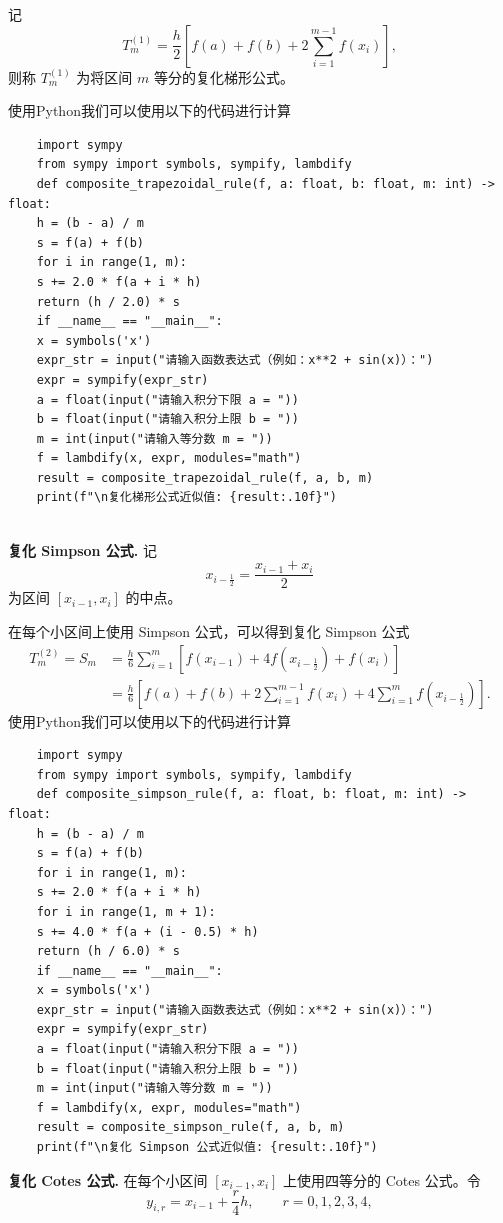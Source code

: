 记
\[
T_m^{(1)}
=\frac{h}{2}\left[f(a)+f(b)+2\sum_{i=1}^{m-1}f(x_i)\right],
\]
则称 $T_m^{(1)}$ 为将区间 $m$ 等分的复化梯形公式。

使用Python我们可以使用以下的代码进行计算
\begin{verbatim}
	import sympy
	from sympy import symbols, sympify, lambdify
	def composite_trapezoidal_rule(f, a: float, b: float, m: int) -> float:
	h = (b - a) / m
	s = f(a) + f(b)
	for i in range(1, m):
	s += 2.0 * f(a + i * h)
	return (h / 2.0) * s
	if __name__ == "__main__":
	x = symbols('x')
	expr_str = input("请输入函数表达式（例如：x**2 + sin(x)）：")
	expr = sympify(expr_str)
	a = float(input("请输入积分下限 a = "))
	b = float(input("请输入积分上限 b = "))
	m = int(input("请输入等分数 m = "))
	f = lambdify(x, expr, modules="math")
	result = composite_trapezoidal_rule(f, a, b, m)
	print(f"\n复化梯形公式近似值: {result:.10f}")
	
\end{verbatim}
	\textbf{复化 Simpson 公式.}
	记
	\[
	x_{i-\frac12}=\frac{x_{i-1}+x_i}{2}
	\]
	为区间 $[x_{i-1},x_i]$ 的中点。


在每个小区间上使用 Simpson 公式，可以得到复化 Simpson 公式
\[
\begin{aligned}
	T_m^{(2)}=S_m
	&=\frac{h}{6}\sum_{i=1}^{m}
	\left[f(x_{i-1})+4f\left(x_{i-\frac12}\right)+f(x_i)\right] \\[4pt]
	&=\frac{h}{6}\left[f(a)+f(b)
	+2\sum_{i=1}^{m-1}f(x_i)
	+4\sum_{i=1}^{m}f\left(x_{i-\frac12}\right)\right].
\end{aligned}
\]
使用Python我们可以使用以下的代码进行计算
\begin{verbatim}
	import sympy
	from sympy import symbols, sympify, lambdify
	def composite_simpson_rule(f, a: float, b: float, m: int) -> float:
	h = (b - a) / m
	s = f(a) + f(b)
	for i in range(1, m):
	s += 2.0 * f(a + i * h)
	for i in range(1, m + 1):
	s += 4.0 * f(a + (i - 0.5) * h)
	return (h / 6.0) * s
	if __name__ == "__main__":
	x = symbols('x')
	expr_str = input("请输入函数表达式（例如：x**2 + sin(x)）：")
	expr = sympify(expr_str)
	a = float(input("请输入积分下限 a = "))
	b = float(input("请输入积分上限 b = "))
	m = int(input("请输入等分数 m = "))
	f = lambdify(x, expr, modules="math")
	result = composite_simpson_rule(f, a, b, m)
	print(f"\n复化 Simpson 公式近似值: {result:.10f}")
\end{verbatim}
	\textbf{复化 Cotes 公式.}
	在每个小区间 $[x_{i-1},x_i]$ 上使用四等分的 Cotes 公式。令
	\[
	y_{i,r}=x_{i-1}+\frac{r}{4}h,
	\qquad r=0,1,2,3,4,
	\]


